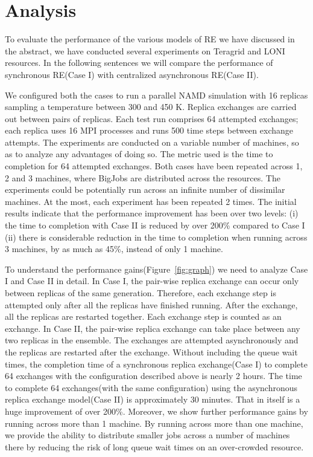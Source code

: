 \documentclass[a4paper,10pt]{article}
\begin{document}
\section{Analysis}

To evaluate the performance of the various models of RE we have discussed in the abstract, we have conducted several experiments on Teragrid and LONI resources. In the following sentences we will compare the performance of synchronous RE(Case I) with centralized asynchronous RE(Case II). 

We configured both the cases to run a parallel NAMD simulation with 16 replicas sampling a temperature between 300 and 450 K. Replica exchanges are carried out between pairs of replicas. Each test run comprises 64 attempted exchanges; each replica uses 16 MPI processes and runs 500 time steps between exchange attempts. The experiments are conducted on a variable number of machines, so as to analyze any advantages of doing so. The metric used is the time to completion for 64 attempted exchanges. Both cases have been repeated across 1, 2 and 3 machines, where BigJobs are distributed across the resources. The experiments could be potentially run across an infinite number of dissimilar machines. At the most, each experiment has been repeated 2 times. 
The initial results indicate that the performance improvement has been over two levels: (i) the time to completion with Case II is reduced by over 200\% compared to Case I (ii) there is considerable reduction in the time to completion when running across 3 machines, by as much as 45\%, instead of only 1 machine. 

To understand the performance gains(Figure~\ref{fig:graph}) we need to analyze Case I and Case II in detail. In Case I, the pair-wise replica exchange can occur only between replicas of the same generation. Therefore, each exchange step is attempted only after all the replicas have finished running. After the exchange, all the replicas are restarted together. Each exchange step is counted as an exchange.
In Case II, the pair-wise replica exchange can take place between any two replicas in the ensemble. The exchanges are attempted asynchronously and the replicas are restarted after the exchange. 
Without including the queue wait times, the completion time of a synchronous replica exchange(Case I) to complete 64 exchanges with the configuration described above is nearly 2 hours. The time to complete 64 exchanges(with the same configuration) using the asynchronous replica exchange model(Case II) is approximately 30 minutes. That in itself is a huge improvement of over 200\%.
Moreover, we show further performance gains by running across more than 1 machine. By running across more than one machine, we provide the ability to distribute smaller jobs across a number of machines there by reducing the risk of long queue wait times on an over-crowded resource. 
\end{document}
